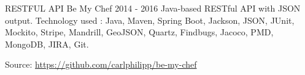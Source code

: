 \begin{cventries}
  \vspace{-2.0mm}
  \projectentry
  	{RESTFUL API} %
  	{Be My Chef} %
  	{2014 - 2016} %
    {Java-based RESTful API with JSON output.\linebreak
Technology used : Java, Maven, Spring Boot, Jackson, JSON, JUnit, Mockito, Stripe, Mandrill, GeoJSON, Quartz, Findbugs, Jacoco, PMD, MongoDB, JIRA, Git.
    }
    {
    \begin{projectdetails}
        	\item Source: \href{https://github.com/carlphilipp/be-my-chef}{https://github.com/carlphilipp/be-my-chef}
      \end{projectdetails}
    }

\end{cventries}
\vspace{-2.0mm}
